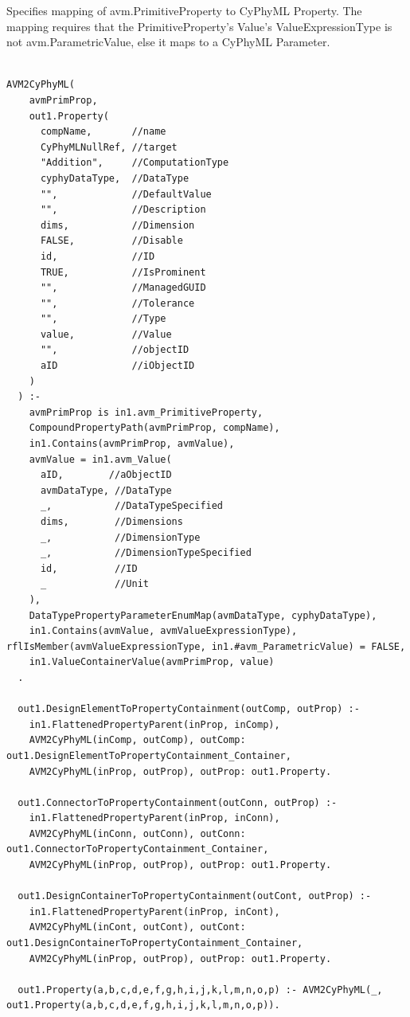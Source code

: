 Specifies mapping of avm.PrimitiveProperty to CyPhyML Property. The mapping requires that the PrimitiveProperty's Value's ValueExpressionType is not avm.ParametricValue, else it maps to a CyPhyML Parameter.
\begin{lstlisting}

AVM2CyPhyML(
    avmPrimProp,
    out1.Property(
      compName,       //name
      CyPhyMLNullRef, //target
      "Addition",     //ComputationType
      cyphyDataType,  //DataType
      "",             //DefaultValue
      "",             //Description
      dims,           //Dimension
      FALSE,          //Disable
      id,             //ID
      TRUE,           //IsProminent
      "",             //ManagedGUID
      "",             //Tolerance
      "",             //Type
      value,          //Value
      "",             //objectID
      aID             //iObjectID
    )
  ) :-
    avmPrimProp is in1.avm_PrimitiveProperty,
    CompoundPropertyPath(avmPrimProp, compName),
    in1.Contains(avmPrimProp, avmValue),
    avmValue = in1.avm_Value(
      aID,        //aObjectID
      avmDataType, //DataType
      _,           //DataTypeSpecified
      dims,        //Dimensions
      _,           //DimensionType
      _,           //DimensionTypeSpecified
      id,          //ID
      _            //Unit
    ),
    DataTypePropertyParameterEnumMap(avmDataType, cyphyDataType),
    in1.Contains(avmValue, avmValueExpressionType), rflIsMember(avmValueExpressionType, in1.#avm_ParametricValue) = FALSE,
    in1.ValueContainerValue(avmPrimProp, value)
  .

  out1.DesignElementToPropertyContainment(outComp, outProp) :-
    in1.FlattenedPropertyParent(inProp, inComp),
    AVM2CyPhyML(inComp, outComp), outComp: out1.DesignElementToPropertyContainment_Container,
    AVM2CyPhyML(inProp, outProp), outProp: out1.Property.

  out1.ConnectorToPropertyContainment(outConn, outProp) :-
    in1.FlattenedPropertyParent(inProp, inConn),
    AVM2CyPhyML(inConn, outConn), outConn: out1.ConnectorToPropertyContainment_Container,
    AVM2CyPhyML(inProp, outProp), outProp: out1.Property.

  out1.DesignContainerToPropertyContainment(outCont, outProp) :-
    in1.FlattenedPropertyParent(inProp, inCont),
    AVM2CyPhyML(inCont, outCont), outCont: out1.DesignContainerToPropertyContainment_Container,
    AVM2CyPhyML(inProp, outProp), outProp: out1.Property.

  out1.Property(a,b,c,d,e,f,g,h,i,j,k,l,m,n,o,p) :- AVM2CyPhyML(_, out1.Property(a,b,c,d,e,f,g,h,i,j,k,l,m,n,o,p)).


\end{lstlisting}

